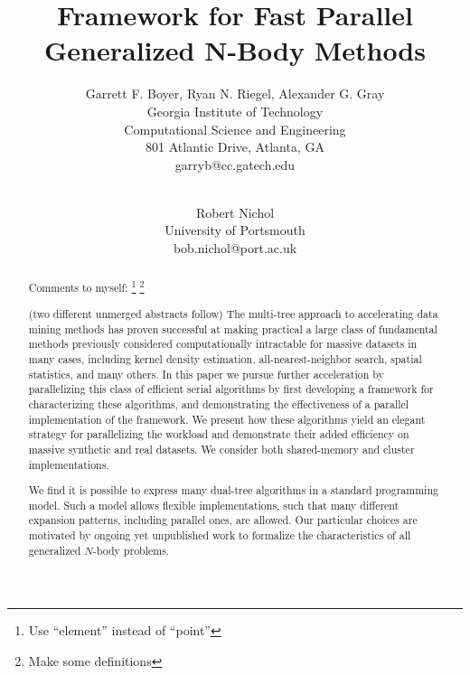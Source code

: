 \documentclass[times, 10pt,twocolumn]{article}
\begin{document}
\title{Framework for Fast Parallel Generalized N-Body Methods}

\author{Garrett F. Boyer, Ryan N. Riegel, Alexander G. Gray
\\ Georgia Institute of Technology
\\ Computational Science and Engineering
\\ 801 Atlantic Drive, Atlanta, GA
\\ garryb@cc.gatech.edu
\\
\and
\\ Robert Nichol
\\ University of Portsmouth
\\ bob.nichol@port.ac.uk
}

\maketitle
\thispagestyle{empty}

\begin{abstract}

Comments to myself:
\footnote{Use ``element'' instead of ``point''}
\footnote{Make some definitions}

(two different unmerged abstracts follow)
The multi-tree approach to accelerating data mining methods has proven successful at making practical a large class of fundamental methods previously considered computationally intractable for massive datasets in many cases, including kernel density estimation, all-nearest-neighbor search, spatial statistics, and many others.
In this paper we pursue further acceleration by parallelizing this class of efficient serial algorithms by first developing a framework for characterizing these algorithms, and demonstrating the effectiveness of a parallel implementation of the framework.
We present how these algorithms yield an elegant strategy for parallelizing the workload and demonstrate their added efficiency on massive synthetic and real datasets.
We consider both shared-memory and cluster implementations.

We find it is possible to express many dual-tree algorithms in a standard programming model.
Such a model allows flexible implementations, such that many different expansion patterns, including parallel ones, are allowed.
Our particular choices are motivated by ongoing yet unpublished work to formalize the characteristics of all generalized $N$-body problems.
\end{abstract}
\end{document}
